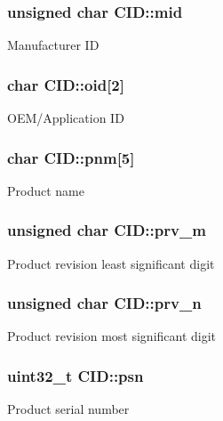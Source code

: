 \subsubsection[{\texorpdfstring{mid}{mid}}]{\setlength{\rightskip}{0pt plus 5cm}unsigned char C\+I\+D\+::mid}\hypertarget{struct_c_i_d_aa77436aa64a8a0e80573ade765039d2f}{}\label{struct_c_i_d_aa77436aa64a8a0e80573ade765039d2f}
Manufacturer ID 
\subsubsection[{\texorpdfstring{oid}{oid}}]{\setlength{\rightskip}{0pt plus 5cm}char C\+I\+D\+::oid\mbox{[}2\mbox{]}}\hypertarget{struct_c_i_d_a12cb950aa46c62c8af1e530006f97031}{}\label{struct_c_i_d_a12cb950aa46c62c8af1e530006f97031}
O\+E\+M/\+Application ID 
\subsubsection[{\texorpdfstring{pnm}{pnm}}]{\setlength{\rightskip}{0pt plus 5cm}char C\+I\+D\+::pnm\mbox{[}5\mbox{]}}\hypertarget{struct_c_i_d_a6484cd56fc4bacfa815c12d8682129ba}{}\label{struct_c_i_d_a6484cd56fc4bacfa815c12d8682129ba}
Product name 
\subsubsection[{\texorpdfstring{prv\+\_\+m}{prv_m}}]{\setlength{\rightskip}{0pt plus 5cm}unsigned char C\+I\+D\+::prv\+\_\+m}\hypertarget{struct_c_i_d_a142fd792bb74d7af1f0fb62833ae053b}{}\label{struct_c_i_d_a142fd792bb74d7af1f0fb62833ae053b}
Product revision least significant digit 
\subsubsection[{\texorpdfstring{prv\+\_\+n}{prv_n}}]{\setlength{\rightskip}{0pt plus 5cm}unsigned char C\+I\+D\+::prv\+\_\+n}\hypertarget{struct_c_i_d_ae50f389a50daf99d15d1ea7ce2d426cf}{}\label{struct_c_i_d_ae50f389a50daf99d15d1ea7ce2d426cf}
Product revision most significant digit 
\subsubsection[{\texorpdfstring{psn}{psn}}]{\setlength{\rightskip}{0pt plus 5cm}uint32\+\_\+t C\+I\+D\+::psn}\hypertarget{struct_c_i_d_ada215f8541fa46078461d8da9574fc5e}{}\label{struct_c_i_d_ada215f8541fa46078461d8da9574fc5e}
Product serial number 
